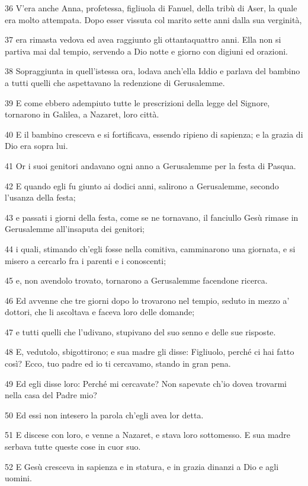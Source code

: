 \par 36 V'era anche Anna, profetessa, figliuola di Fanuel, della tribù di Aser, la quale era molto attempata. Dopo esser vissuta col marito sette anni dalla sua verginità,
\par 37 era rimasta vedova ed avea raggiunto gli ottantaquattro anni. Ella non si partiva mai dal tempio, servendo a Dio notte e giorno con digiuni ed orazioni.
\par 38 Sopraggiunta in quell'istessa ora, lodava anch'ella Iddio e parlava del bambino a tutti quelli che aspettavano la redenzione di Gerusalemme.
\par 39 E come ebbero adempiuto tutte le prescrizioni della legge del Signore, tornarono in Galilea, a Nazaret, loro città.
\par 40 E il bambino cresceva e si fortificava, essendo ripieno di sapienza; e la grazia di Dio era sopra lui.
\par 41 Or i suoi genitori andavano ogni anno a Gerusalemme per la festa di Pasqua.
\par 42 E quando egli fu giunto ai dodici anni, salirono a Gerusalemme, secondo l'usanza della festa;
\par 43 e passati i giorni della festa, come se ne tornavano, il fanciullo Gesù rimase in Gerusalemme all'insaputa dei genitori;
\par 44 i quali, stimando ch'egli fosse nella comitiva, camminarono una giornata, e si misero a cercarlo fra i parenti e i conoscenti;
\par 45 e, non avendolo trovato, tornarono a Gerusalemme facendone ricerca.
\par 46 Ed avvenne che tre giorni dopo lo trovarono nel tempio, seduto in mezzo a' dottori, che li ascoltava e faceva loro delle domande;
\par 47 e tutti quelli che l'udivano, stupivano del suo senno e delle sue risposte.
\par 48 E, vedutolo, sbigottirono; e sua madre gli disse: Figliuolo, perché ci hai fatto così? Ecco, tuo padre ed io ti cercavamo, stando in gran pena.
\par 49 Ed egli disse loro: Perché mi cercavate? Non sapevate ch'io dovea trovarmi nella casa del Padre mio?
\par 50 Ed essi non intesero la parola ch'egli avea lor detta.
\par 51 E discese con loro, e venne a Nazaret, e stava loro sottomesso. E sua madre serbava tutte queste cose in cuor suo.
\par 52 E Gesù cresceva in sapienza e in statura, e in grazia dinanzi a Dio e agli uomini.

